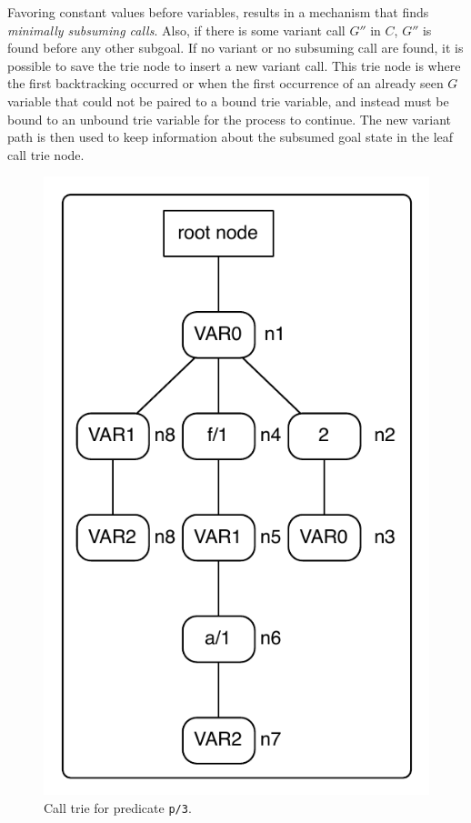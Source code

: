 Favoring constant values before variables, results in a mechanism that finds \textit{minimally subsuming calls}.
Also, if there is some variant call $G''$ in $C$, $G''$ is found before any other subgoal. If no variant 
or no subsuming call are found, it is possible to save the trie node to insert a new variant call.
This trie node is where the first backtracking occurred or when the first occurrence of
an already seen $G$ variable that could not be paired to a bound trie variable, and instead
must be bound to an unbound trie variable for the process to continue.
The new variant path is then used to keep information about the subsumed goal state in
the leaf call trie node.

\begin{figure}[ht]
  \centering
    \includegraphics[scale=0.6]{sub_call_search.pdf}
  \caption{Call trie for predicate \texttt{p/3}.}
  \label{fig:sub_call_search}
\end{figure}

